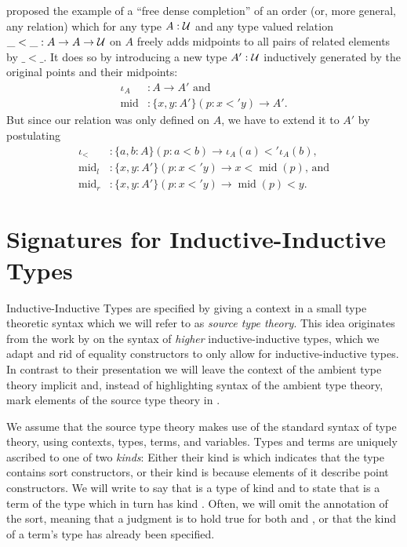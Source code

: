 \begin{example}
\citet{nordvallinductive} proposed the example of a ``free dense completion'' of
an order (or, more general, any relation) which for any type $A : \mathcal{U}$ and
any type valued relation $\_<\_ : A \to A \to \mathcal{U}$ on $A$ freely adds midpoints
to all pairs of related elements by $\_<\_$.
It does so by introducing a new type $A' : \mathcal{U}$ inductively generated by the
original points and their midpoints:
\begin{align*}
\iota_A		&: A \to A' \text{ and} \\
\mathop{mid}	&: \{x, y : A'\}(p : x <' y) \to A' \text{.}
\end{align*}
But since our relation was only defined on $A$, we have to extend it to $A'$ by
postulating
\begin{align*}
\iota_<		&: \{a, b : A\}(p : a < b) \to \iota_A(a) <' \iota_A(b) \text{,} \\
\mathop{mid}_l	&: \{x, y : A'\}(p : x <' y) \to x < \mathop{mid}(p) \text{, and} \\
\mathop{mid}_r	&: \{x, y : A'\}(p : x <' y) \to \mathop{mid}(p) < y \text{.}
\end{align*}
\end{example}


\section{Signatures for Inductive-Inductive Types}\label{sec:ii-syntax}

Inductive-Inductive Types are specified by giving a context in  a small type
theoretic syntax which we will refer to as \emph{source type theory}.
This idea originates from the work by \citet{ambrussyntax} on the syntax of \emph{higher}
inductive-inductive types, which we adapt and rid of equality
constructors to only allow for inductive-inductive types.
In contrast to their presentation we will leave the context of the ambient type
theory implicit and, instead of highlighting syntax of the ambient type theory,
mark elements of the source type theory in .

We assume that the source type theory makes use of the standard syntax of type
theory, using contexts, types, terms, and variables.
Types and terms are uniquely ascribed to one of two \emph{kinds}:
Either their kind is \grm{\Sc} which indicates that the type contains sort
constructors, or their kind is \grm{\Pc} because elements of it describe
point constructors.
We will write  to say that  is a type of kind
 and  to state that  is a term of the
type  which in turn has kind .
Often, we will omit the annotation of the sort, meaning that a judgment is to
hold true for both \grm{\Sc} and \grm{\Pc}, or that the kind of a term's type
has already been specified.


